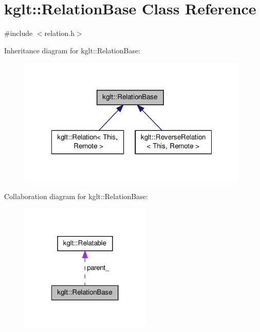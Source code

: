 \hypertarget{classkglt_1_1_relation_base}{\section{kglt\-:\-:Relation\-Base Class Reference}
\label{classkglt_1_1_relation_base}
}


{\ttfamily \#include $<$relation.\-h$>$}



Inheritance diagram for kglt\-:\-:Relation\-Base\-:\nopagebreak
\begin{figure}[H]
\begin{center}
\leavevmode
\includegraphics[width=312pt]{classkglt_1_1_relation_base__inherit__graph}
\end{center}
\end{figure}


Collaboration diagram for kglt\-:\-:Relation\-Base\-:\nopagebreak
\begin{figure}[H]
\begin{center}
\leavevmode
\includegraphics[width=176pt]{classkglt_1_1_relation_base__coll__graph}
\end{center}
\end{figure}
